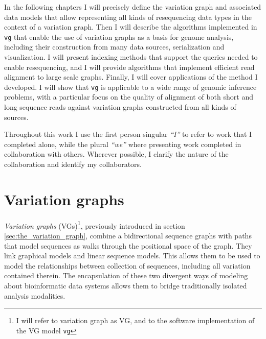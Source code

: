 \documentclass[a4paper,12pt,numbered,oneside]{Classes/PhDThesisPSnPDF}
\providecommand{\DIFaddbegin}{} %
\providecommand{\DIFaddend}{} %
\begin{document}
In the following chapters I will precisely define the variation graph and associated data models that allow representing all kinds of resequencing data types in the context of a variation graph.
Then I will describe the algorithms implemented in {\tt vg} that enable the use of variation graphs as a basis for genome analysis, including their construction from many data sources, serialization and visualization.
I will present indexing methods that support the queries needed to enable resequencing, and I will provide algorithms that implement efficient read alignment to large scale graphs.
Finally, I will cover applications of the method I developed.
I will show that {\tt vg} is applicable to a wide range of genomic inference problems, with a particular focus on the quality of alignment of both short and long sequence reads against variation graphs constructed from all kinds of sources.

Throughout this work I use the first person singular \emph{``I''} to refer to work that I completed alone, while the plural \emph{``we''} where presenting work completed in collaboration with others.
Wherever possible, I clarify the nature of the collaboration and identify my collaborators.

%

\chapter{Variation graphs}

\DIFaddbegin \label{chapter:variation_graphs}

\DIFaddend \ifpdf
    \graphicspath{{Chapter2/Figs/Raster/}{Chapter2/Figs/PDF/}{Chapter2/Figs/}}
\else
    \graphicspath{{Chapter2/Figs/Vector/}{Chapter2/Figs/}}
\fi

\emph{Variation graphs} (VGs)\footnote{I will refer to variation graph as VG, and to the software implementation of the VG model {\tt vg}}, previously introduced in section \ref{sec:the_variation_graph}, combine a bidirectional sequence graphs with paths that model sequences as walks through the positional space of the graph.
They link graphical models and linear sequence models.
This allows them to be used to model the relationships between collection of sequences, including all variation contained therein.
The encapsulation of these two divergent ways of modeling about bioinformatic data systems allows them to bridge traditionally isolated analysis modalities.
\end{document}
